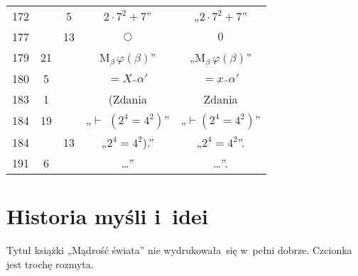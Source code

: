 \documentclass[a4paper,11pt]{article}
\begin{document}
\begin{center}
\begin{tabular}{|c|c|c|c|c|}
    172 & &  5 & $2 \cdot 7^{ 2 } + 7$” & „$2 \cdot 7^{ 2 } + 7$” \\
    177 & & 13 & $\bigcirc$ & $0$ \\
    179 & 21 & & $\textrm{M}_{ \beta }\, \varphi( \beta )$”
           & „$\textrm{M}_{ \beta }\, \varphi( \beta )$” \\
    180 &  5 & & $=\!\! X \hat{ \;\, } \alpha'$
           & $= x \hat{ \;\, } \alpha'$ \\
    183 &  1 & & (Zdania & Zdania \\
    184 & 19 & & „$\vdash$ $( 2^{ 4 } = 4^{ 2 })$”
           & „$\vdash$$( 2^{ 4 } = 4^{ 2 })$” \\
    184 & & 13 & „$2^{ 4 } = 4^{2}$).” & „$2^{ 4 } = 4^{2}$”. \\
    191 &  6 & & \ldots” & \ldots”. \\
    \hline
  \end{tabular}

\end{center}

\vspace{\spaceTwo}













\newpage
\section{Historia myśli i~idei}

\vspace{\spaceTwo}










\start {} Tytuł książki „Mądrość świata” nie wydrukowała~się
w~pełni dobrze. Czcionka jest trochę rozmyta.
\end{document}
